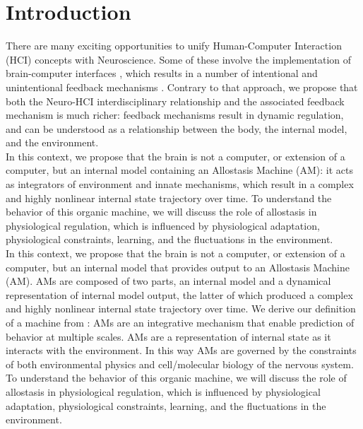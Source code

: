 \documentclass{sigchi}
\begin{document}
\section{Introduction}

There are many exciting opportunities to unify Human-Computer Interaction (HCI) concepts with Neuroscience. Some of these involve the implementation of brain-computer interfaces \cite{zander}, which results in a number of intentional and unintentional feedback mechanisms \cite{ritter}. Contrary to that approach, we propose that both the Neuro-HCI interdisciplinary relationship and the associated feedback mechanism is much richer: feedback mechanisms result in dynamic regulation, and can be understood as a relationship between the body, the internal model, and the environment.\\
In this context, we propose that the brain is not a computer, or extension of a computer, but an internal model containing an Allostasis Machine (AM): it acts as integrators of environment and innate mechanisms, which result in a complex and highly nonlinear internal state trajectory over time. To understand the behavior of this organic machine, we will discuss the role of allostasis in physiological regulation, which is influenced by physiological adaptation, physiological constraints, learning, and the fluctuations in the environment.\\
In this context, we propose that the brain is not a computer, or extension of a computer, but an internal model that provides output to an Allostasis Machine (AM). AMs are composed of two parts, an internal model and a dynamical representation of internal model output, the latter of which produced a complex and highly nonlinear internal state trajectory over time. We derive our definition of a machine from \cite{bongard-levin}: AMs are an integrative mechanism that enable prediction of behavior at multiple scales. AMs are a representation of internal state as it interacts with the environment. In this way AMs are governed by the constraints of both environmental physics and cell/molecular biology of the nervous system. To understand the behavior of this organic machine, we will discuss the role of allostasis in physiological regulation, which is influenced by physiological adaptation, physiological constraints, learning, and the fluctuations in the environment.
\end{document}
